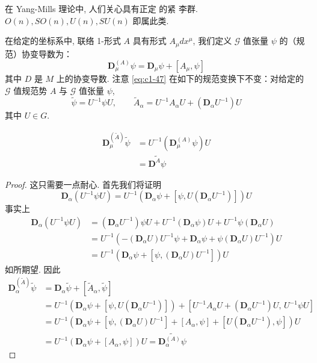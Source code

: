 在 Yang-Mills 理论中, 人们关心具有正定 的紧 李群. $O(n), SO(n), U(n), SU(n)$ 即属此类. 

在给定的坐标系中, 联络 1-形式 $A$ 具有形式 $A_\mu dx^\mu$, 我们定义 $\mathcal{G}$ 值张量 $\psi$ 的（规范）协变导数为：
\begin{equation}
\mathbf{D}_\mu^{(A)}\psi = \mathbf{D}_\mu\psi + [A_\mu, \psi]\label{eq:c1-47}
\end{equation}
其中 $D$ 是 $M$ 上的协变导数. 注意 \eqref{eq:c1-47} 在如下的规范变换下不变：对给定的 $\mathcal{G}$ 值规范势 $A$ 与 $\mathcal{G}$ 值张量 $\psi$, 
\begin{equation}
\tilde{\psi} = U^{-1}\psi U, \qquad \tilde{A}_\alpha = U^{-1}A_\alpha U + (\mathbf{D}_\alpha U^{-1})U\label{eq:c1-48}
\end{equation}
其中 $U \in G$. 

\begin{proposition}\label{prop:c1-1.1}
\[
\begin{aligned}
\mathbf{D}_\mu^{(\tilde{A})}\tilde{\psi} &= U^{-1}\left(\mathbf{D}_\mu^{(A)}\psi\right)U\\
&= \widetilde{\mathbf{D}^A\psi}
\end{aligned}
\]
\end{proposition}

\begin{proof}
这只需要一点耐心. 首先我们将证明
\[
\mathbf{D}_\alpha\left(U^{-1}\psi U\right) = U^{-1}\left(\mathbf{D}_\alpha\psi + [\psi, U(\mathbf{D}_\alpha U^{-1})]\right)U
\]
事实上
\[
\begin{aligned}
\mathbf{D}_\alpha(U^{-1}\psi U) &= (\mathbf{D}_\alpha U^{-1})\psi U + U^{-1}(\mathbf{D}_\alpha\psi)U + U^{-1}\psi(\mathbf{D}_\alpha U)\\
&= U^{-1}\left(-(\mathbf{D}_\alpha U)U^{-1}\psi + \mathbf{D}_\alpha\psi + \psi(\mathbf{D}_\alpha U)U^{-1}\right)U\\
&= U^{-1}\left(\mathbf{D}_\alpha\psi + [\psi, (\mathbf{D}_\alpha U)U^{-1}]\right)U
\end{aligned}
\]
如所期望. 因此
\[
\begin{aligned}
\mathbf{D}_\alpha^{(\tilde{A})}\tilde{\psi} &= \mathbf{D}_\alpha\tilde{\psi} + [\tilde{A}_\alpha, \tilde{\psi}]\\
&= U^{-1}\left(\mathbf{D}_\alpha\psi + [\psi, U(\mathbf{D}_\alpha U^{-1})]\right) + [U^{-1}A_\alpha U + (\mathbf{D}_\alpha U^{-1})U, \, U^{-1}\psi U]\\
&= U^{-1}\left(\mathbf{D}_\alpha\psi + [\psi, (\mathbf{D}_\alpha U)U^{-1}] + [A_\alpha, \psi] + [U(\mathbf{D}_\alpha U^{-1}), \psi]\right)U\\
&= U^{-1}\left(\mathbf{D}_\alpha\psi + [A_\alpha, \psi]\right)U = \widetilde{\mathbf{D}_\alpha^{(A)}\psi}
\end{aligned}
\]
\end{proof}


